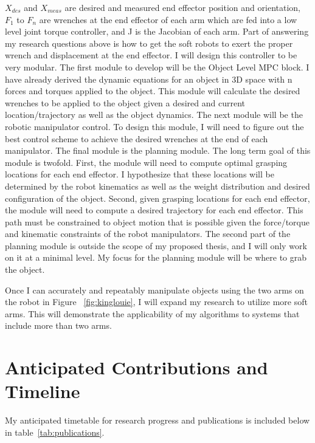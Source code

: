 \documentclass[12pt, letterpaper]{article}
\begin{document}
$X_{des}$ and $X_{meas}$ are desired and measured end effector position and orientation, $F_1$ to $F_n$ are wrenches at the end effector of each arm which are fed into a low level joint torque controller, and J is the Jacobian of each arm. Part of answering my research questions above is how to get the soft robots to exert the proper wrench and displacement at the end effector. I will design this controller to be very modular. The first module to develop will be the Object Level MPC block. I have already derived the dynamic equations for an object in 3D space with n forces and torques applied to the object. This module will calculate the desired wrenches to be applied to the object given a desired and current location/trajectory as well as the object dynamics. The next module will be the robotic manipulator control. To design this module, I will need to figure out the best control scheme to achieve the desired wrenches at the end of each manipulator. The final module is the planning module. The long term goal of this module is twofold. First, the module will need to compute optimal grasping locations for each end effector. I hypothesize that these locations will be determined by the robot kinematics as well as the weight distribution and desired configuration of the object. Second, given grasping locations for each end effector, the module will need to compute a desired trajectory for each end effector. This path must be constrained to object motion that is possible given the force/torque and kinematic constraints of the robot manipulators. The second part of the planning module is outside the scope of my proposed thesis, and I will only work on it at a minimal level. My focus for the planning module will be where to grab the object.

Once I can accurately and repeatably manipulate objects using the two arms on the robot in Figure ~\ref{fig:kinglouie}, I will expand my research to utilize more soft arms. This will demonstrate the applicability of my algorithms to systems that include more than two arms.

\section{Anticipated Contributions and Timeline}
My anticipated timetable for research progress and publications is included below in table~\ref{tab:publications}.
\end{document}
